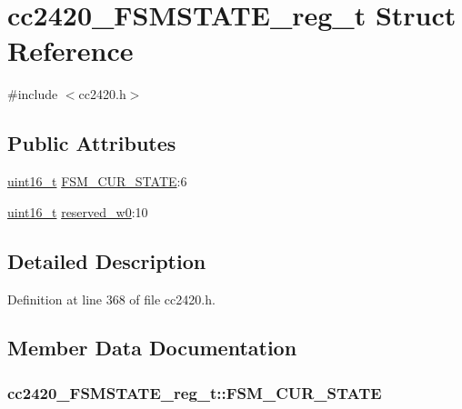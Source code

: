 \hypertarget{structcc2420___f_s_m_s_t_a_t_e__reg__t}{}\section{cc2420\+\_\+\+F\+S\+M\+S\+T\+A\+T\+E\+\_\+reg\+\_\+t Struct Reference}
\label{structcc2420___f_s_m_s_t_a_t_e__reg__t}


{\ttfamily \#include $<$cc2420.\+h$>$}

\subsection*{Public Attributes}
\begin{DoxyCompactItemize}
\item 
\hyperlink{_p_e___types_8h_a1f1825b69244eb3ad2c7165ddc99c956}{uint16\+\_\+t} \hyperlink{structcc2420___f_s_m_s_t_a_t_e__reg__t_a627d7edc85d1e752a76fa75a1a7c4d18}{F\+S\+M\+\_\+\+C\+U\+R\+\_\+\+S\+T\+A\+TE}\+:6
\item 
\hyperlink{_p_e___types_8h_a1f1825b69244eb3ad2c7165ddc99c956}{uint16\+\_\+t} \hyperlink{structcc2420___f_s_m_s_t_a_t_e__reg__t_aaf6080d56d30826b92509da1346898c8}{reserved\+\_\+w0}\+:10
\end{DoxyCompactItemize}


\subsection{Detailed Description}


Definition at line 368 of file cc2420.\+h.



\subsection{Member Data Documentation}
\subsubsection[{\texorpdfstring{F\+S\+M\+\_\+\+C\+U\+R\+\_\+\+S\+T\+A\+TE}{FSM_CUR_STATE}}]{ cc2420\+\_\+\+F\+S\+M\+S\+T\+A\+T\+E\+\_\+reg\+\_\+t\+::\+F\+S\+M\+\_\+\+C\+U\+R\+\_\+\+S\+T\+A\+TE}\hypertarget{structcc2420___f_s_m_s_t_a_t_e__reg__t_a627d7edc85d1e752a76fa75a1a7c4d18}{}\label{structcc2420___f_s_m_s_t_a_t_e__reg__t_a627d7edc85d1e752a76fa75a1a7c4d18}


